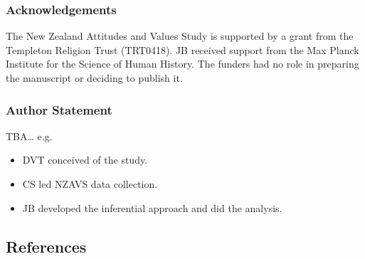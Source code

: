 \documentclass[
  singlecolumn]{article}
\providecommand{\tightlist}{%
  \setlength{\itemsep}{0pt}\setlength{\parskip}{0pt}}\usepackage{longtable,booktabs,array}
\begin{document}
\subsubsection{Acknowledgements}\label{acknowledgements}

The New Zealand Attitudes and Values Study is supported by a grant from
the Templeton Religion Trust (TRT0418). JB received support from the Max
Planck Institute for the Science of Human History. The funders had no
role in preparing the manuscript or deciding to publish it.

\subsubsection{Author Statement}\label{author-statement}

TBA\ldots{} e.g.~

\begin{itemize}
\tightlist
\item
  DVT conceived of the study.
\item
  CS led NZAVS data collection.
\item
  JB developed the inferential approach and did the analysis.
\end{itemize}

\newpage{}

\subsection{References}\label{references}
\end{document}
